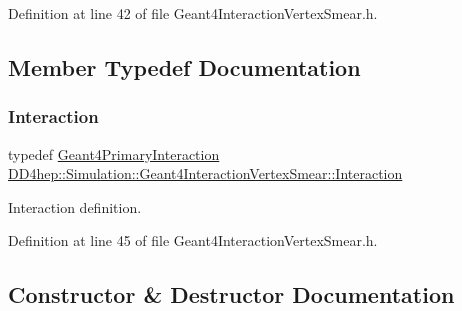 Definition at line 42 of file Geant4\+Interaction\+Vertex\+Smear.\+h.



\subsection{Member Typedef Documentation}
\hypertarget{class_d_d4hep_1_1_simulation_1_1_geant4_interaction_vertex_smear_ab70397967639759170996f67855a8c74}{}\label{class_d_d4hep_1_1_simulation_1_1_geant4_interaction_vertex_smear_ab70397967639759170996f67855a8c74} 
\subsubsection{\texorpdfstring{Interaction}{Interaction}}
{\footnotesize\ttfamily typedef \hyperlink{class_d_d4hep_1_1_simulation_1_1_geant4_primary_interaction}{Geant4\+Primary\+Interaction} \hyperlink{class_d_d4hep_1_1_simulation_1_1_geant4_interaction_vertex_smear_ab70397967639759170996f67855a8c74}{D\+D4hep\+::\+Simulation\+::\+Geant4\+Interaction\+Vertex\+Smear\+::\+Interaction}}



Interaction definition. 



Definition at line 45 of file Geant4\+Interaction\+Vertex\+Smear.\+h.



\subsection{Constructor \& Destructor Documentation}
\hypertarget{class_d_d4hep_1_1_simulation_1_1_geant4_interaction_vertex_smear_ad9e83f372fc7dc142f60a709e863d605}{}\label{class_d_d4hep_1_1_simulation_1_1_geant4_interaction_vertex_smear_ad9e83f372fc7dc142f60a709e863d605} 
